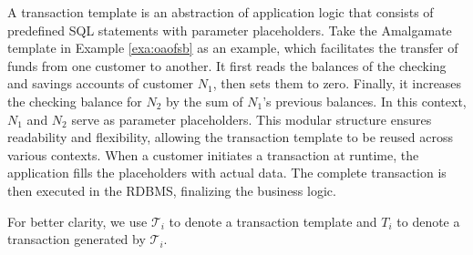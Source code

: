 A transaction template is an abstraction of application logic that consists of predefined SQL statements with parameter placeholders. 
Take the Amalgamate template in Example \ref{exa:oaofsb} as an example, 
which facilitates the transfer of funds from one customer to another. It first reads the balances of the checking and savings accounts of customer $N_1$, then sets them to zero. Finally, it increases the checking balance for $N_2$ by the sum of $ N_1$'s previous balances. In this context, $N_1$ and $N_2$ serve as parameter placeholders. This modular structure ensures readability and flexibility, allowing the transaction template to be reused across various contexts.
When a customer initiates a transaction at runtime, the application fills the placeholders with actual data. The complete transaction is then executed in the RDBMS, finalizing the business logic.

For better clarity, we use $\mathcal{T}_i$ to denote a transaction template and $T_i$ to denote a transaction generated by $\mathcal{T}_i$.




